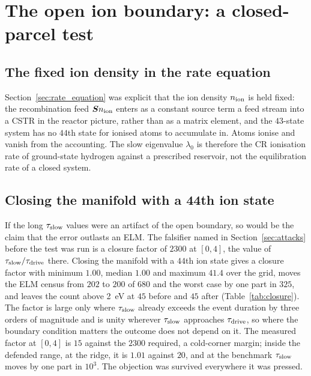 \section{The open ion boundary: a closed-parcel test}
\label{sec:open_system}

\subsection{The fixed ion density in the rate equation}

Section~\ref{sec:rate_equation} was explicit that the ion density $n_{\mathrm{ion}}$ is
held fixed: the recombination feed $\bm{S}n_{\mathrm{ion}}$ enters as a constant source term
a feed stream into a CSTR in the reactor picture, rather than as a
matrix element, and the $43$-state system has no $44$th state for ionised atoms
to accumulate in. Atoms ionise and vanish from the accounting. The slow
eigenvalue $\lambda_0$ is therefore the CR ionisation rate of ground-state
hydrogen against a prescribed reservoir, not the equilibration rate of a closed
system.

\subsection{Closing the manifold with a 44th ion state}

If the long $\tau_{\mathrm{slow}}$ values were an artifact of the open boundary, so would be
the claim that the error outlasts an ELM. The falsifier named in
Section~\ref{sec:attacks} before the test was run is a closure factor of $2300$
at $[0,4]$, the value of $\tau_{\mathrm{slow}}/\tau_{\mathrm{drive}}$ there. Closing the manifold with
a $44$th ion state gives a closure factor with minimum $1.00$, median $1.00$
and maximum $41.4$ over the grid, moves the ELM census from $202$ to $200$ of
$680$ and the worst case by one part in $325$, and leaves the count above
\SI{2}{\electronvolt} at $45$ before and $45$ after (Table~\ref{tab:closure}).
The factor is large only where $\tau_{\mathrm{slow}}$ already exceeds the event duration by
three orders of magnitude and is unity wherever $\tau_{\mathrm{slow}}$ approaches
$\tau_{\mathrm{drive}}$, so where the boundary condition matters the outcome does not
depend on it. The measured factor at $[0,4]$ is $15$ against the $2300$
required, a cold-corner margin; inside the defended range, at the ridge, it is
$1.01$ against $20$, and at the benchmark $\tau_{\mathrm{slow}}$ moves by one part in
$10^{3}$. The objection was survived everywhere it was pressed.

